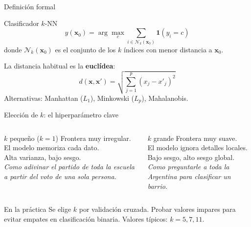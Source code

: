 \documentclass[aspectratio=169]{beamer}
\newcommand{\bx}{\bm{x}}
\begin{document}
\begin{frame}{Definición formal}
  \begin{block}{Clasificador $k$-NN}
    \[
      \hat{y}(\bx_0) = \arg\max_c \sum_{i \in \mathcal{N}_k(\bx_0)} \mathbf{1}(y_i = c)
    \]
    donde $\mathcal{N}_k(\bx_0)$ es el conjunto de los $k$ índices con menor distancia a $\bx_0$.
  \end{block}

  \medskip
  La distancia habitual es la \textbf{euclídea}:
  \[
    d(\bx, \bx') = \sqrt{\sum_{j=1}^{p}(x_j - x'_j)^2}
  \]
  Alternativas: Manhattan ($L_1$), Minkowski ($L_p$), Mahalanobis.
\end{frame}

\begin{frame}{Elección de $k$: el hiperparámetro clave}
  \begin{columns}
    \begin{alertblock}{$k$ pequeño ($k=1$)}
      Frontera muy irregular.\\
      El modelo memoriza cada dato.\\
      Alta varianza, bajo sesgo.\\[4pt]
      \textit{Como adivinar el partido de toda la escuela a partir del voto de una sola persona.}
    \end{alertblock}

    \begin{alertblock}{$k$ grande}
      Frontera muy suave.\\
      El modelo ignora detalles locales.\\
      Bajo sesgo, alto sesgo global.\\[4pt]
      \textit{Como preguntarle a toda la Argentina para clasificar un barrio.}
    \end{alertblock}
  \end{columns}

  \medskip
  \begin{block}{En la práctica}
    Se elige $k$ por validación cruzada.
    Probar valores impares para evitar empates en clasificación binaria.
    Valores típicos: $k = 5, 7, 11$.
  \end{block}
\end{frame}
\end{document}
